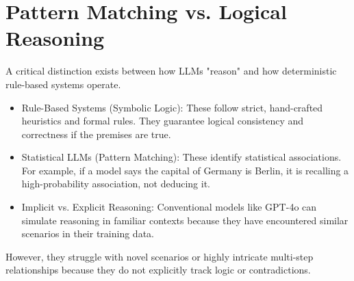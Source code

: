 ﻿\section{Pattern Matching vs. Logical Reasoning}
\label{sec:pattern-matching-vs-logical-reasoning}


A critical distinction exists between how LLMs "reason" and how deterministic rule-based systems operate.

\begin{itemize}
  \item Rule-Based Systems (Symbolic Logic): These follow strict, hand-crafted heuristics and formal rules. They guarantee logical consistency and correctness if the premises are true.
  \item Statistical LLMs (Pattern Matching): These identify statistical associations. For example, if a model says the capital of Germany is Berlin, it is recalling a high-probability association, not deducing it.
  \item Implicit vs. Explicit Reasoning: Conventional models like GPT-4o can simulate reasoning in familiar contexts because they have encountered similar scenarios in their training data.
\end{itemize}

 However, they struggle with novel scenarios or highly intricate multi-step relationships because they do not explicitly track logic or contradictions.